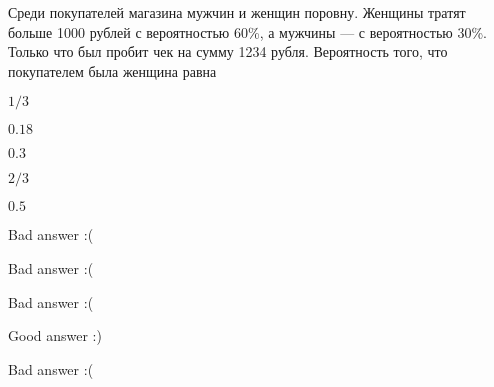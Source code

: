 
\begin{question}
Среди покупателей магазина мужчин и женщин поровну. Женщины тратят
больше 1000 рублей с вероятностью 60\%, а мужчины --- с вероятностью
30\%. Только что был пробит чек на сумму 1234 рубля. Вероятность того,
что покупателем была женщина равна
\begin{answerlist}
  \item \(1/3\)
  \item \(0.18\)
  \item \(0.3\)
  \item \(2/3\)
  \item \(0.5\)
\end{answerlist}
\end{question}

\begin{solution}
\begin{answerlist}
  \item Bad answer :(
  \item Bad answer :(
  \item Bad answer :(
  \item Good answer :)
  \item Bad answer :(
\end{answerlist}
\end{solution}

